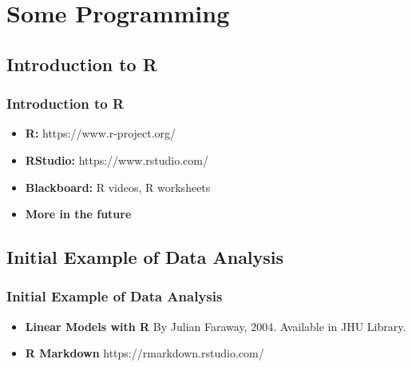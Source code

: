 \documentclass[serif,mathserif,professionalfont]{beamer}
\begin{document}
\section{Some Programming}

\subsection{Introduction to R}


\begin{frame}
	
	\frametitle{Introduction to R}
	
	\LARGE 
	\begin{itemize}
		\item \textbf{R:} https://www.r-project.org/
		\item \textbf{RStudio:} https://www.rstudio.com/
		\item \textbf{Blackboard:} R videos, R worksheets
		\item \textbf{More in the future}
	\end{itemize}
	
	
	
\end{frame}


\subsection{Initial Example of Data Analysis}


\begin{frame}
	
	\frametitle{Initial Example of Data Analysis}
	
	\LARGE
	\begin{itemize}
		\item \textbf{Linear Models with R} \newline
		By Julian Faraway, 2004. Available in JHU Library.
		\item \textbf{R Markdown} \newline
		https://rmarkdown.rstudio.com/
	\end{itemize}
	
	
	
\end{frame}
\end{document}
